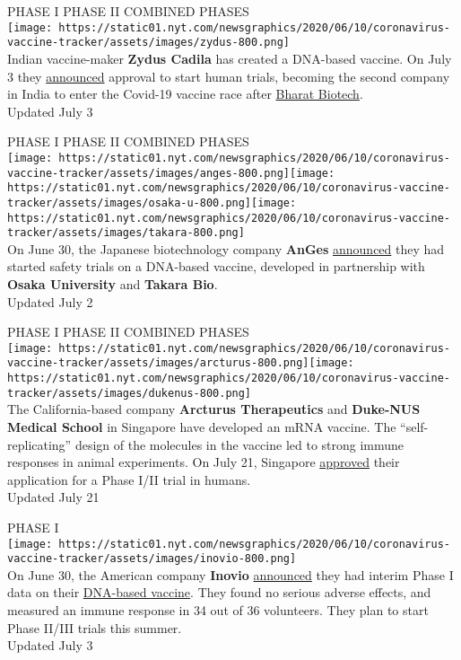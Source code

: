 PHASE I PHASE II COMBINED PHASES\\
\texttt{[image: https://static01.nyt.com/newsgraphics/2020/06/10/coronavirus-vaccine-tracker/assets/images/zydus-800.png]}\\
Indian vaccine-maker \textbf{Zydus Cadila} has created a DNA-based
vaccine. On July 3 they
\href{https://twitter.com/ZydusUniverse/status/1278997989382483968}{announced}
approval to start human trials, becoming the second company in India to
enter the Covid-19 vaccine race after \protect\hyperlink{bharat}{Bharat
Biotech}.\\
Updated July 3

PHASE I PHASE II COMBINED PHASES\\
\texttt{[image: https://static01.nyt.com/newsgraphics/2020/06/10/coronavirus-vaccine-tracker/assets/images/anges-800.png]}\texttt{[image: https://static01.nyt.com/newsgraphics/2020/06/10/coronavirus-vaccine-tracker/assets/images/osaka-u-800.png]}\texttt{[image: https://static01.nyt.com/newsgraphics/2020/06/10/coronavirus-vaccine-tracker/assets/images/takara-800.png]}\\
On June 30, the Japanese biotechnology company \textbf{AnGes}
\href{https://www.japantimes.co.jp/news/2020/06/30/national/science-health/japan-first-coronavirus-vaccine-clinical-test-starts/}{announced}
they had started safety trials on a DNA-based vaccine, developed in
partnership with \textbf{Osaka University} and \textbf{Takara Bio}.\\
Updated July 2

PHASE I PHASE II COMBINED PHASES\\
\texttt{[image: https://static01.nyt.com/newsgraphics/2020/06/10/coronavirus-vaccine-tracker/assets/images/arcturus-800.png]}\texttt{[image: https://static01.nyt.com/newsgraphics/2020/06/10/coronavirus-vaccine-tracker/assets/images/dukenus-800.png]}\\
The California-based company \textbf{Arcturus Therapeutics} and
\textbf{Duke-NUS Medical School} in Singapore have developed an mRNA
vaccine. The ``self-replicating'' design of the molecules in the vaccine
led to strong immune responses in animal experiments. On July 21,
Singapore
\href{https://ir.arcturusrx.com/news-releases/news-release-details/arcturus-therapeutics-duke-nus-received-approval-proceed-phase}{approved}
their application for a Phase I/II trial in humans.\\
Updated July 21

PHASE I\\
\texttt{[image: https://static01.nyt.com/newsgraphics/2020/06/10/coronavirus-vaccine-tracker/assets/images/inovio-800.png]}\\
On June 30, the American company \textbf{Inovio}
\href{http://ir.inovio.com/news-releases/news-releases-details/2020/INOVIO-Announces-Positive-Interim-Phase-1-Data-For-INO-4800-Vaccine-for-COVID-19/default.aspx}{announced}
they had interim Phase I data on their
\href{https://www.nytimes.com/2020/06/13/science/vaccine-coronavirus-inovio.html}{DNA-based
vaccine}. They found no serious adverse effects, and measured an immune
response in 34 out of 36 volunteers. They plan to start Phase II/III
trials this summer.\\
Updated July 3

